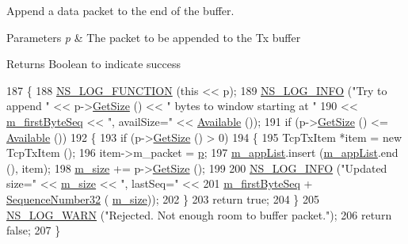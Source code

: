 Append a data packet to the end of the buffer. 


\begin{DoxyParams}{Parameters}
{\em p} & The packet to be appended to the Tx buffer \\
\hline
\end{DoxyParams}
\begin{DoxyReturn}{Returns}
Boolean to indicate success 
\end{DoxyReturn}

\begin{DoxyCode}
187 \{
188   \hyperlink{log-macros-disabled_8h_a90b90d5bad1f39cb1b64923ea94c0761}{NS\_LOG\_FUNCTION} (\textcolor{keyword}{this} << p);
189   \hyperlink{group__logging_gafbd73ee2cf9f26b319f49086d8e860fb}{NS\_LOG\_INFO} (\textcolor{stringliteral}{"Try to append "} << p->\hyperlink{classns3_1_1Packet_a462855c9929954d4301a4edfe55f4f1c}{GetSize} () << \textcolor{stringliteral}{" bytes to window starting at "}
190                                 << \hyperlink{classns3_1_1TcpTxBuffer_a46b67e5cb3396b43a41dd3fd5b135346}{m\_firstByteSeq} << \textcolor{stringliteral}{", availSize="} << 
      \hyperlink{classns3_1_1TcpTxBuffer_a6063c2b280533f8e640296e6d0204ba2}{Available} ());
191   \textcolor{keywordflow}{if} (p->\hyperlink{classns3_1_1Packet_a462855c9929954d4301a4edfe55f4f1c}{GetSize} () <= \hyperlink{classns3_1_1TcpTxBuffer_a6063c2b280533f8e640296e6d0204ba2}{Available} ())
192     \{
193       \textcolor{keywordflow}{if} (p->\hyperlink{classns3_1_1Packet_a462855c9929954d4301a4edfe55f4f1c}{GetSize} () > 0)
194         \{
195           TcpTxItem *item = \textcolor{keyword}{new} TcpTxItem ();
196           item->m\_packet = \hyperlink{lte__link__budget_8m_ac9de518908a968428863f829398a4e62}{p};
197           \hyperlink{classns3_1_1TcpTxBuffer_ac85673c102b50188282a70152cc542ca}{m\_appList}.insert (\hyperlink{classns3_1_1TcpTxBuffer_ac85673c102b50188282a70152cc542ca}{m\_appList}.end (), item);
198           \hyperlink{classns3_1_1TcpTxBuffer_ace81d07d65ea00d9609dcc65a926564c}{m\_size} += p->\hyperlink{classns3_1_1Packet_a462855c9929954d4301a4edfe55f4f1c}{GetSize} ();
199 
200           \hyperlink{group__logging_gafbd73ee2cf9f26b319f49086d8e860fb}{NS\_LOG\_INFO} (\textcolor{stringliteral}{"Updated size="} << \hyperlink{classns3_1_1TcpTxBuffer_ace81d07d65ea00d9609dcc65a926564c}{m\_size} << \textcolor{stringliteral}{", lastSeq="} <<
201                        \hyperlink{classns3_1_1TcpTxBuffer_a46b67e5cb3396b43a41dd3fd5b135346}{m\_firstByteSeq} + \hyperlink{group__network_gacb2070e4e98d2d5135c9bede58f07a03}{SequenceNumber32} (
      \hyperlink{classns3_1_1TcpTxBuffer_ace81d07d65ea00d9609dcc65a926564c}{m\_size}));
202         \}
203       \textcolor{keywordflow}{return} \textcolor{keyword}{true};
204     \}
205   \hyperlink{group__logging_gade7208b4009cdf0e25783cd26766f559}{NS\_LOG\_WARN} (\textcolor{stringliteral}{"Rejected. Not enough room to buffer packet."});
206   \textcolor{keywordflow}{return} \textcolor{keyword}{false};
207 \}
\end{DoxyCode}



